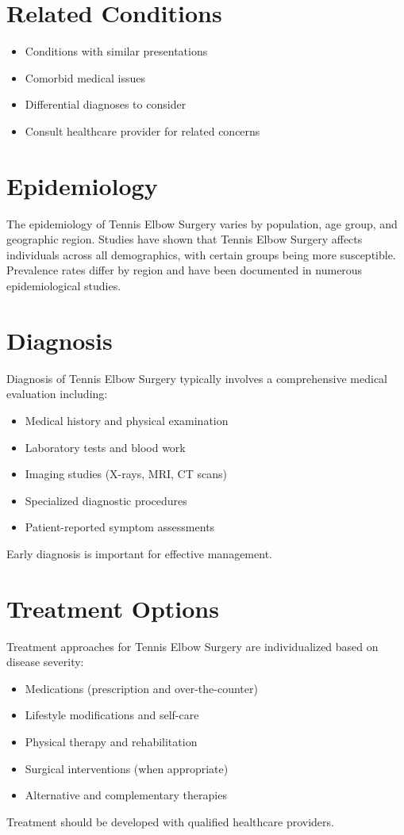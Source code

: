 \section*{Related Conditions}
\begin{itemize}
  \item Conditions with similar presentations
  \item Comorbid medical issues
  \item Differential diagnoses to consider
  \item Consult healthcare provider for related concerns
\end{itemize}

\section*{Epidemiology}
The epidemiology of Tennis Elbow Surgery varies by population, age group, and geographic region. Studies have shown that Tennis Elbow Surgery affects individuals across all demographics, with certain groups being more susceptible. Prevalence rates differ by region and have been documented in numerous epidemiological studies.

\section*{Diagnosis}
Diagnosis of Tennis Elbow Surgery typically involves a comprehensive medical evaluation including:
\begin{itemize}
  \item Medical history and physical examination
  \item Laboratory tests and blood work
  \item Imaging studies (X-rays, MRI, CT scans)
  \item Specialized diagnostic procedures
  \item Patient-reported symptom assessments
\end{itemize}
Early diagnosis is important for effective management.

\section*{Treatment Options}
Treatment approaches for Tennis Elbow Surgery are individualized based on disease severity:
\begin{itemize}
  \item Medications (prescription and over-the-counter)
  \item Lifestyle modifications and self-care
  \item Physical therapy and rehabilitation
  \item Surgical interventions (when appropriate)
  \item Alternative and complementary therapies
\end{itemize}
Treatment should be developed with qualified healthcare providers.

